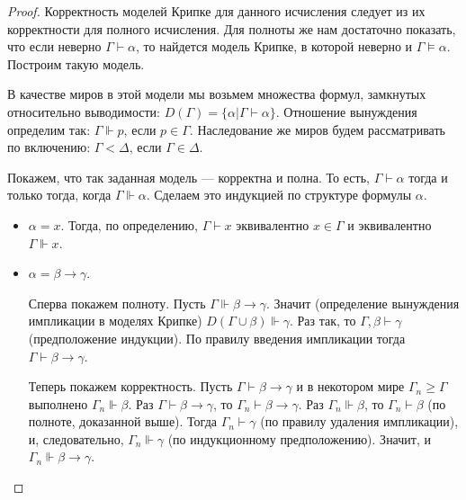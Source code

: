 \begin{proof}
Корректность моделей Крипке для данного исчисления следует из их корректности
для полного исчисления. Для полноты же нам достаточно показать, что если 
неверно $\Gamma\vdash\alpha$, то найдется
модель Крипке, в которой неверно и $\Gamma\models\alpha$. 
Построим такую модель.

В качестве миров в этой модели мы возьмем множества формул, замкнутых относительно
выводимости: $D(\Gamma) = \{ \alpha | \Gamma\vdash\alpha \}$. 
Отношение вынуждения определим так: $\Gamma\Vdash p$, если $p \in \Gamma$.
Наследование же миров будем рассматривать по включению: $\Gamma < \Delta$, если
$\Gamma \in \Delta$.

Покажем, что так заданная модель --- корректна и полна. То есть, 
$\Gamma\vdash\alpha$ тогда и только тогда, когда $\Gamma\Vdash\alpha$. 
Сделаем это индукцией по структуре формулы $\alpha$.

\begin{itemize}
\item $\alpha = x$. Тогда, по определению, $\Gamma\vdash x$ эквивалентно 
$x \in \Gamma$ и эквивалентно $\Gamma\Vdash x$.
\item $\alpha = \beta\rightarrow\gamma$.

Сперва покажем полноту.
Пусть $\Gamma\Vdash\beta\rightarrow\gamma$. Значит (определение вынуждения
импликации в моделях Крипке) $D(\Gamma\cup\beta)\Vdash\gamma$. Раз так, то 
$\Gamma,\beta\vdash\gamma$ (предположение индукции). По правилу введения 
импликации тогда $\Gamma\vdash\beta\rightarrow\gamma$.

Теперь покажем корректность.
Пусть $\Gamma\vdash\beta\rightarrow\gamma$ и в некотором мире 
$\Gamma_n \ge \Gamma$ выполнено $\Gamma_n\Vdash\beta$.
Раз $\Gamma \vdash\beta\rightarrow\gamma$, то $\Gamma_n\vdash\beta\rightarrow\gamma$.
Раз $\Gamma_n\Vdash\beta$, то $\Gamma_n\vdash\beta$ (по полноте, доказанной выше).
Тогда $\Gamma_n\vdash\gamma$ (по правилу удаления импликации), 
и, следовательно, $\Gamma_n\Vdash\gamma$ (по индукционному предположению).
Значит, и $\Gamma_n\Vdash\beta\rightarrow\gamma$.
\end{itemize}

\end{proof}

